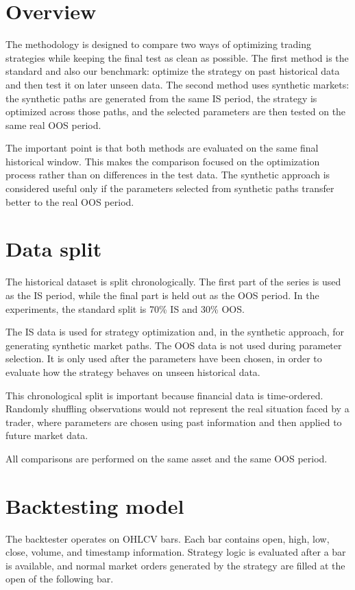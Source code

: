 \section{Overview}

The methodology is designed to compare two ways of optimizing trading strategies while keeping the
final test as clean as possible. The first method is the standard and also our benchmark: optimize
the strategy on past historical data and then test it on later unseen data. The second method uses
synthetic markets: the synthetic paths are generated from the same IS period, the strategy is
optimized across those paths, and the selected parameters are then tested on the same real OOS
period.

The important point is that both methods are evaluated on the same final historical window. This
makes the comparison focused on the optimization process rather than on differences in the test
data. The synthetic approach is considered useful only if the parameters selected from synthetic
paths transfer better to the real OOS period.

\section{Data split}

The historical dataset is split chronologically. The first part of the series is used as the IS
period, while the final part is held out as the OOS period. In the experiments, the standard split
is 70\% IS and 30\% OOS.

The IS data is used for strategy optimization and, in the synthetic approach, for generating
synthetic market paths. The OOS data is not used during parameter selection. It is only used after
the parameters have been chosen, in order to evaluate how the strategy behaves on unseen historical
data.

This chronological split is important because financial data is time-ordered. Randomly shuffling
observations would not represent the real situation faced by a trader, where parameters are chosen
using past information and then applied to future market data.

All comparisons are performed on the same asset and the same OOS period.

\section{Backtesting model}

The backtester operates on OHLCV bars. Each bar contains open, high, low, close, volume, and
timestamp information. Strategy logic is evaluated after a bar is available, and normal market
orders generated by the strategy are filled at the open of the following bar.

